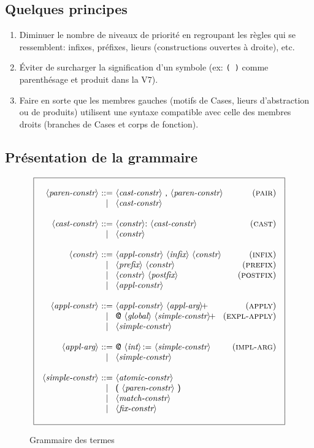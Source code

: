 \documentclass{article}
\makeatletter
\def\NT#1{\langle\textit{#1}\rangle}
\def\TERM#1{\textsf{#1}}
\def\PLUS#1{#1\!+}
\newenvironment{cadre}
        {\begin{array}{|c|}\hline\\}
        {\\\\\hline\end{array}}
\newenvironment{rulebox}
        {$$\begin{cadre}\begin{array}{r@{~}c@{~}l@{}r}}
        {\end{array}\end{cadre}$$}
\def\DEFNT#1{\NT{#1} & ::= &}
\def\RNAME#1{(\textsc{#1})}
\def\SEPDEF{\\\\}
\def\nlsep{\\&|&}
\makeatother
\begin{document}
\subsection{Quelques principes}

\begin{enumerate}
\item Diminuer le nombre de niveaux de priorité en regroupant les
  règles qui se ressemblent: infixes, préfixes, lieurs (constructions
  ouvertes à droite), etc.
\item Éviter de surcharger la signification d'un symbole (ex:
  \verb+( )+ comme parenthésage et produit dans la V7).
\item Faire en sorte que les membres gauches (motifs de Cases, lieurs
  d'abstraction ou de produits) utilisent une syntaxe compatible avec
  celle des membres droits (branches de Cases et corps de fonction).
\end{enumerate}

\subsection{Présentation de la grammaire}

\begin{figure}
\begin{rulebox}
\DEFNT{paren-constr}
       \NT{cast-constr}~\TERM{,}~\NT{paren-constr}     &\RNAME{pair}
\nlsep \NT{cast-constr}
\SEPDEF
\DEFNT{cast-constr}
       \NT{constr}~\TERM{\!\!:}~\NT{cast-constr}       &\RNAME{cast}
\nlsep \NT{constr}
\SEPDEF
\DEFNT{constr}
       \NT{appl-constr}~\NT{infix}~\NT{constr}      &\RNAME{infix}
\nlsep \NT{prefix}~\NT{constr}                      &\RNAME{prefix}
\nlsep \NT{constr}~\NT{postfix}                     &\RNAME{postfix}
\nlsep \NT{appl-constr}
\SEPDEF
\DEFNT{appl-constr}
       \NT{appl-constr}~\PLUS{\NT{appl-arg}}           &\RNAME{apply}
\nlsep \TERM{@}~\NT{global}~\PLUS{\NT{simple-constr}}  &\RNAME{expl-apply}
\nlsep \NT{simple-constr}
\SEPDEF
\DEFNT{appl-arg}
       \TERM{@}~\NT{int}~\TERM{\!:=}~\NT{simple-constr}  &\RNAME{impl-arg}
\nlsep \NT{simple-constr}
\SEPDEF
\DEFNT{simple-constr}
       \NT{atomic-constr}
\nlsep \TERM{(}~\NT{paren-constr}~\TERM{)}
\nlsep \NT{match-constr}
\nlsep \NT{fix-constr}
\end{rulebox}
\caption{Grammaire des termes}
\label{constr}
\end{figure}
\end{document}
